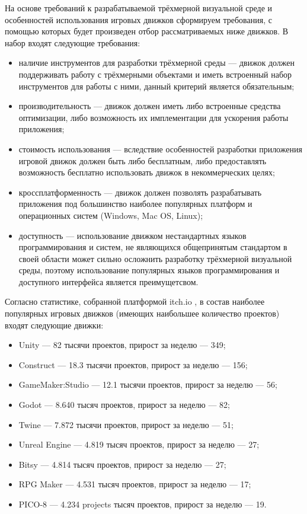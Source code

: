 На основе требований к разрабатываемой трёхмерной визуальной среде и особенностей использования игровых движков сформируем требования, с помощью которых будет произведен отбор рассматриваемых ниже движков. В набор входят следующие требования:
\begin{itemize}
\item наличие инструментов для разработки трёхмерной среды --- движок должен поддерживать работу с трёхмерными объектами и иметь встроенный набор инструментов для работы с ними, данный критерий является обязательным;
\item производительность --- движок должен иметь либо встроенные средства оптимизации, либо возможность их имплементации для ускорения работы приложения;
\item стоимость использования --- вследствие особенностей разработки приложения игровой движок должен быть либо бесплатным, либо предоставлять возможность бесплатно использовать движок в некоммерческих целях;
\item кроссплатформенность --- движок должен позволять разрабатывать приложения под большинство наиболее популярных платформ и операционных систем (Windows, Mac OS, Linux);
\item доступность --- использование движком нестандартных языков программирования и систем, не являющихся общепринятым стандартом в своей области может сильно осложнить разработку трёхмерной визуальной среды, поэтому использование популярных языков программирования и доступного интерфейса является преимущетсвом.
\end{itemize}

Согласно статистике, собранной платформой itch.io \cite{itch}, в состав наиболее популярных игровых движков (имеющих наибольшее количество проектов) входят следующие движки:
\begin{itemize}
\item Unity --- 82 тысячи проектов, прирост за неделю --- 349;
\item Construct --- 18.3 тысячи проектов, прирост за неделю --- 156;
\item GameMaker:Studio --- 12.1 тысячи проектов, прирост за неделю --- 56;
\item Godot --- 8.640 тысяч проектов, прирост за неделю --- 82;
\item Twine --- 7.872 тысячи проектов, прирост за неделю --- 51;
\item Unreal Engine --- 4.819 тысяч проектов, прирост за неделю --- 27;
\item Bitsy --- 4.814 тысяч проектов, прирост за неделю --- 27;
\item RPG Maker --- 4.531 тысяч проектов, прирост за неделю --- 17;
\item PICO-8 --- 4.234 projects тысяч проектов, прирост за неделю --- 19.\\
\end{itemize}

